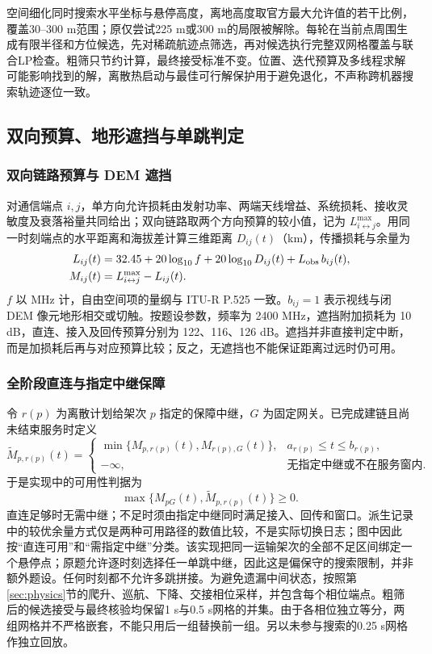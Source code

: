 空间细化同时搜索水平坐标与悬停高度，离地高度取官方最大允许值的若干比例，覆盖30--300 m范围；原仅尝试225 m或300 m的局限被解除。每轮在当前点周围生成有限半径和方位候选，先对稀疏航迹点筛选，再对候选执行完整双网格覆盖与联合LP检查。粗筛只节约计算，最终接受标准不变。位置、迭代预算及多线程求解可能影响找到的解，离散热启动与最佳可行解保护用于避免退化，不声称跨机器搜索轨迹逐位一致。

\subsection{双向预算、地形遮挡与单跳判定}
\subsubsection{双向链路预算与 DEM 遮挡}
对通信端点 $i,j$，单方向允许损耗由发射功率、两端天线增益、系统损耗、接收灵敏度及衰落裕量共同给出；双向链路取两个方向预算的较小值，记为 $L^{\max}_{i\leftrightarrow j}$。用同一时刻端点的水平距离和海拔差计算三维距离 $D_{ij}(t)$（km），传播损耗与余量为
\begin{align}
L_{ij}(t)&=32.45+20\log_{10}f+20\log_{10}D_{ij}(t)
                 +L_{\rm obs}\,b_{ij}(t),\label{eq:fspl}\\
M_{ij}(t)&=L^{\max}_{i\leftrightarrow j}-L_{ij}(t).\label{eq:margin}
\end{align}
$f$ 以 MHz 计，自由空间项的量纲与 ITU-R P.525 一致\cite{itu}。$b_{ij}=1$ 表示视线与闭 DEM 像元地形相交或切触。按题设参数，频率为 2400 MHz，遮挡附加损耗为 10 dB，直连、接入及回传预算分别为 122、116、126 dB。遮挡并非直接判定中断，而是加损耗后再与对应预算比较；反之，无遮挡也不能保证距离过远时仍可用。

\subsubsection{全阶段直连与指定中继保障}
令 $r(p)$ 为离散计划给架次 $p$ 指定的保障中继，$G$ 为固定网关。已完成建链且尚未结束服务时定义
\begin{equation}
\widetilde M_{p,r(p)}(t)=
\begin{cases}
\min\{M_{p,r(p)}(t),M_{r(p),G}(t)\},&a_{r(p)}\le t\le b_{r(p)},\\
-\infty,&\text{无指定中继或不在服务窗内}.
\end{cases}\label{eq:relaymargin}
\end{equation}
于是实现中的可用性判据为
\begin{equation}
\max\{M_{pG}(t),\widetilde M_{p,r(p)}(t)\}\ge0.\label{eq:comm}
\end{equation}
直连足够时无需中继；不足时须由指定中继同时满足接入、回传和窗口。派生记录中的较优余量方式仅是两种可用路径的数值比较，不是实际切换日志；图中因此按“直连可用”和“需指定中继”分类。该实现把同一运输架次的全部不足区间绑定一个悬停点；原题允许逐时刻选择任一单跳中继，因此这是偏保守的搜索限制，并非额外题设。任何时刻都不允许多跳拼接。为避免遗漏中间状态，按照第\ref{sec:physics}节的爬升、巡航、下降、交接相位采样，并包含每个相位端点。粗筛后的候选接受与最终核验均保留1 s与0.5 s网格的并集。由于各相位独立等分，两组网格并不严格嵌套，不能只用后一组替换前一组。另以未参与搜索的0.25 s网格作独立回放。

